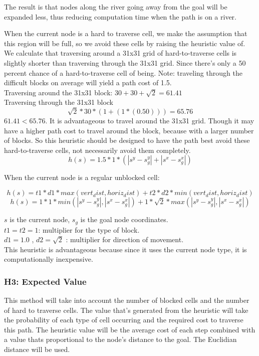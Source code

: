 The result is that nodes along the river going away from the goal will be expanded less, thus reducing computation time when the path is on a river.

When the current node is a hard to traverse cell, we make the assumption that this region will be full, so we avoid these cells by raising the heuristic value of.
We calculate that traversing around a 31x31 grid of hard-to-traverse cells is slightly shorter than traversing through the 31x31 grid. Since there's only a 50 percent chance of a hard-to-traverse cell of being. Note: traveling through the difficult blocks on average will yield a path cost of 1.5.
\\Traversing around the 31x31 block: $ 30 + 30 + \sqrt{2} = 61.41$
\\Traversing through the 31x31 block \[ \sqrt{2} * 30 * (1 + (1 * (0.50))) = 65.76\] 
$61.41 < 65.76$. It is advantageous to travel around the 31x31 grid.
Though it may have a higher path cost to travel around the block, because with a larger number of blocks.
So this heuristic should be designed to have the path best avoid these hard-to-traverse cells, not necessarily avoid them completely.
\[h(s) = 1.5 * 1 * ( |s^y - s_g^y| + |s^x - s_g^x| )\]

When the current node is a regular unblocked cell:

\[h(s) = t1 * d1  * max(vert_dist, horiz_dist) + t2 * d2 * min(vert_dist, horiz_dist)\]
\[h(s) = 1 * 1 *min(|s^y - s_g^y|, |s^x - s_g^x|) + 1 * \sqrt{2} * max(|s^y - s_g^y|, |s^x - s_g^x|)   \]

 $s$ is the current node, $s_g$ is the goal node coordinates. \\
 $t1 = t2 = 1$: multiplier for the type of block. \\
 $d1 = 1.0$ , $d2 = \sqrt{2}$ : multiplier for direction of movement. \\

This heuristic is advantageous because since it uses the current node type, it is computationally inexpensive. 

\subsubsection{H3: Expected Value}
This method will take into account the number of blocked cells and the number of hard to traverse cells. The value that's generated from the heuristic will take the probability of each type of cell occurring and the required cost to traverse this path. The heuristic value will be the average cost of each step combined with a value thats proportional to the node's distance to the goal. The Euclidian distance will be used.

